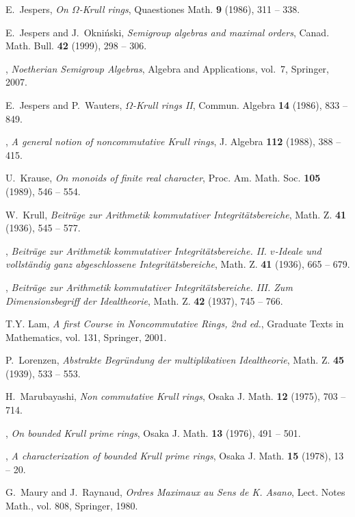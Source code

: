\documentclass[a4paper]{amsart}
\theoremstyle{definition}
\numberwithin{equation}{section}
\begin{document}
\begin{thebibliography}{10}
E.~Jespers, \emph{On {$\Omega$}-{K}rull rings}, Quaestiones Math. \textbf{9}
  (1986), 311 -- 338.

E.~Jespers and J.~Okni{\'n}ski, \emph{{S}emigroup algebras and maximal orders},
  Canad. Math. Bull. \textbf{42} (1999), 298 -- 306.

\bysame, \emph{Noetherian {S}emigroup {A}lgebras}, Algebra and Applications,
  vol.~7, Springer, 2007.

E.~Jespers and P.~Wauters, \emph{{$\Omega$}-{K}rull rings {II}}, Commun.
  Algebra \textbf{14} (1986), 833 -- 849.

\bysame, \emph{A general notion of noncommutative {K}rull rings}, J. Algebra
  \textbf{112} (1988), 388 -- 415.

U.~Krause, \emph{On monoids of finite real character}, Proc. Am. Math. Soc.
  \textbf{105} (1989), 546 -- 554.

W.~Krull, \emph{Beitr{\"a}ge zur {A}rithmetik kommutativer
  {I}ntegrit{\"a}tsbereiche}, Math. Z. \textbf{41} (1936), 545 -- 577.

\bysame, \emph{Beitr{\"a}ge zur {A}rithmetik kommutativer
  {I}ntegrit{\"a}tsbereiche. {II}. $v$-{I}deale und vollst{\"a}ndig ganz
  abgeschlossene {I}ntegrit{\"a}tsbereiche}, Math. Z. \textbf{41} (1936), 665
  -- 679.

\bysame, \emph{Beitr{\"a}ge zur {A}rithmetik kommutativer
  {I}ntegrit{\"a}tsbereiche. {III.} {Z}um {D}imensionsbegriff der
  {I}dealtheorie}, Math. Z. \textbf{42} (1937), 745 -- 766.

T.Y. Lam, \emph{A first {C}ourse in {N}oncommutative {R}ings, 2nd ed.},
  Graduate Texts in Mathematics, vol. 131, Springer, 2001.

P.~Lorenzen, \emph{Abstrakte {B}egr{\"u}ndung der multiplikativen
  {I}dealtheorie}, Math. Z. \textbf{45} (1939), 533 -- 553.

H.~Marubayashi, \emph{Non commutative {K}rull rings}, Osaka J. Math.
  \textbf{12} (1975), 703 -- 714.

\bysame, \emph{On bounded {K}rull prime rings}, Osaka J. Math. \textbf{13}
  (1976), 491 -- 501.

\bysame, \emph{A characterization of bounded {K}rull prime rings}, Osaka J.
  Math. \textbf{15} (1978), 13 -- 20.

G.~Maury and J.~Raynaud, \emph{Ordres {M}aximaux au {S}ens de {K}. {A}sano},
  Lect. Notes Math., vol. 808, Springer, 1980.


\end{thebibliography}
\end{document}
